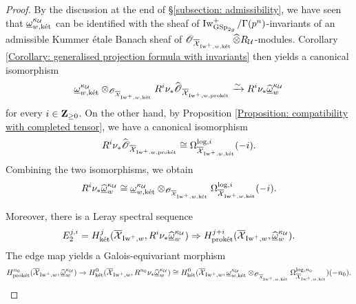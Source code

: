 \begin{proof}
By the discussion at the end of \S \ref{subsection: admissibility}, we have seen that $\underline{\omega}^{\kappa_{\calU}}_{w,\ket}$ can be identified with the sheaf of $\Iw^+_{\GSp_{2g}}/\Gamma(p^n)$-invariants of an admissible Kummer \'etale Banach sheaf of $\scrO_{\overline{\calX}_{\Iw^+, w,\ket}}\widehat{\otimes}R_{\calU}$-modules. Corollary \ref{Corollary: generalised projection formula with invariants} then yields a canonical isomorphism
$$\underline{\omega}_{w, \ket}^{\kappa_{\calU}}\otimes_{\scrO_{\overline{\calX}_{\Iw^+, w,\ket}}}R^i\nu_*\widehat{\scrO}_{\overline{\calX}_{\Iw^+, w, \proket}}\xrightarrow{\sim}R^i\nu_*\widehat{\underline{\omega}}_{w}^{\kappa_{\calU}}$$ for every $i\in \Z_{\geq 0}$. 
On the other hand, by Proposition \ref{Proposition: compatibility with completed tensor}, we have a canonical isomorphism $$R^i\nu_*\widehat{\scrO}_{\overline{\calX}_{\Iw^+, w, \proket}}\cong \Omega^{\log, i}_{\overline{\calX}_{\Iw^+, w, \ket}}(-i).$$ Combining the two isomorphisms, we obtain
$$
R^i\nu_*\widehat{\underline{\omega}}_{w}^{\kappa_{\calU}}\cong \underline{\omega}_{w, \ket}^{\kappa_{\calU}}\otimes_{\scrO_{\overline{\calX}_{\Iw^+, w,\ket}}} \Omega^{\log, i}_{\overline{\calX}_{\Iw^+, w, \ket}}(-i).
$$

Moreover, there is a Leray spectral sequence $$E_2^{j, i}=H_{\ket}^{j}(\overline{\calX}_{\Iw^+, w}, R^i\nu_*\widehat{\underline{\omega}}_w^{\kappa_{\calU}})\Rightarrow H_{\proket}^{j+i}(\overline{\calX}_{\Iw^+, w}, \widehat{\underline{\omega}}_w^{\kappa_{\calU}}).$$ The edge map yields a Galois-equivariant morphism 
$$H^{n_0}_{\proket}(\overline{\calX}_{\Iw^+, w}, \widehat{\underline{\omega}}_w^{\kappa_{\calU}})\rightarrow H^0_{\ket}(\overline{\calX}_{\Iw^+, w}, R^{n_0}\nu_*\widehat{\underline{\omega}}_w^{\kappa_{\calU}})\cong H^{0}_{\ket}(\overline{\calX}_{\Iw^+, w}, \underline{\omega}_{w, \ket}^{\kappa_{\calU}}\otimes_{\scrO_{\overline{\calX}_{\Iw^+, w,\ket}}} \Omega^{\log, n_0}_{\overline{\calX}_{\Iw^+, w, \ket}})(-n_0).$$ 


\end{proof}

